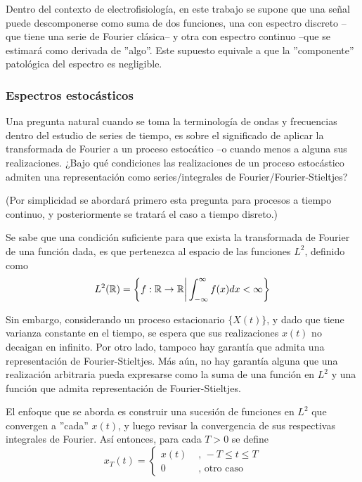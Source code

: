 Dentro del contexto de electrofisiolog\'ia, en este trabajo se supone
que una se\~nal puede descomponerse
como suma de dos funciones, una con espectro discreto --que tiene una serie de Fourier cl\'asica--
y otra con espectro continuo --que se estimar\'a como derivada de ''algo''.
Este supuesto equivale a que la ''componente'' patol\'ogica del espectro es negligible.



\subsubsection{Espectros estoc\'asticos}

Una pregunta natural cuando se toma la terminolog\'ia de ondas y frecuencias dentro
del estudio de series de tiempo, es sobre el significado de aplicar la transformada de Fourier a
un proceso estoc\'atico --o cuando menos a alguna sus realizaciones.
¿Bajo qu\'e condiciones las realizaciones de un proceso estoc\'astico admiten una representaci\'on
como series/integrales de Fourier/Fourier-Stieltjes?

(Por simplicidad se abordar\'a primero esta pregunta para procesos a tiempo continuo, y 
posteriormente se tratar\'a el caso a tiempo disreto.)

Se sabe que una condici\'on suficiente para que exista la transformada de Fourier de una funci\'on
dada, es que pertenezca al espacio de las funciones $L^2$, definido como
\begin{equation*}
L^2(\mathbb{R}) = \left\{ f: \mathbb{R} \rightarrow \mathbb{R} {\biggr\rvert} \int_{-\infty}^{\infty} f(x) dx < \infty \right\}
\end{equation*}

Sin embargo, considerando un proceso estacionario $\{ X(t) \}$, y dado que tiene varianza constante 
en el tiempo, se 
espera que sus realizaciones $x(t)$ no decaigan en infinito. Por otro lado, tampoco hay garant\'ia
que admita una representaci\'on de Fourier-Stieltjes. M\'as a\'un, no hay garant\'ia alguna que
una realizaci\'on arbitraria pueda expresarse como la suma de una funci\'on en $L^2$ y una
funci\'on que admita representaci\'on de Fourier-Stieltjes.

El enfoque que se aborda es construir una sucesi\'on de funciones 
en $L^{2}$
que convergen a ''cada''
$x(t)$, y luego revisar la convergencia de sus respectivas integrales de Fourier.
As\'i entonces, para cada $T>0$ se define
\begin{equation}
x_T(t) = 
\begin{cases}
x(t) & \text{ , } -T\leq t \leq T
\\
0 & \text{ , otro caso}
\end{cases}
\end{equation}

